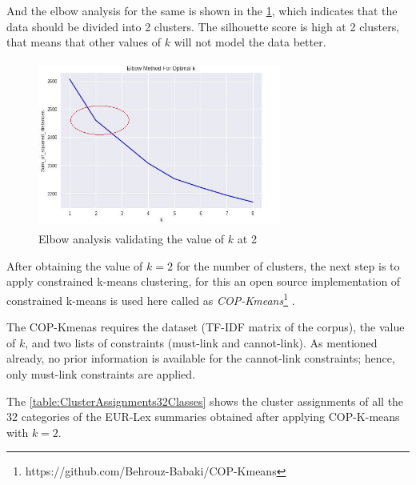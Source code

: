 And the elbow analysis for the same is shown in the \ref{fig:elbowAT2}, which indicates that the data should be divided into 2 clusters. The silhouette score is high at 2 clusters, that means that other values of $k$ will not model the data better. 

\begin{figure}[!ht]
    \centering
    \includegraphics[width=8cm, height=5.5cm]{pics/ElbowAT2.jpg}
    \captionsetup{justification=centering,margin=1cm}
    \caption{Elbow analysis validating the value of $k$ at 2}
    \label{fig:elbowAT2}
\end{figure}

After obtaining the value of $k = 2$ for the number of clusters, the next step is to apply constrained k-means clustering, for this an open source implementation of constrained k-means is used here called as \textit{COP-Kmeans}\footnote{https://github.com/Behrouz-Babaki/COP-Kmeans} \cite{behrouz_babaki_2017_831850}. 

The COP-Kmenas requires the dataset (\gls{TF-IDF} matrix of the corpus), the value of $k$, and two lists of constraints (must-link and cannot-link). As mentioned already, no prior information is available for the cannot-link constraints; hence, only must-link constraints are applied. 

The \ref{table:ClusterAssignments32Classes} shows the cluster assignments of all the 32 categories of the EUR-Lex summaries obtained after applying COP-K-means with $k=2$.


